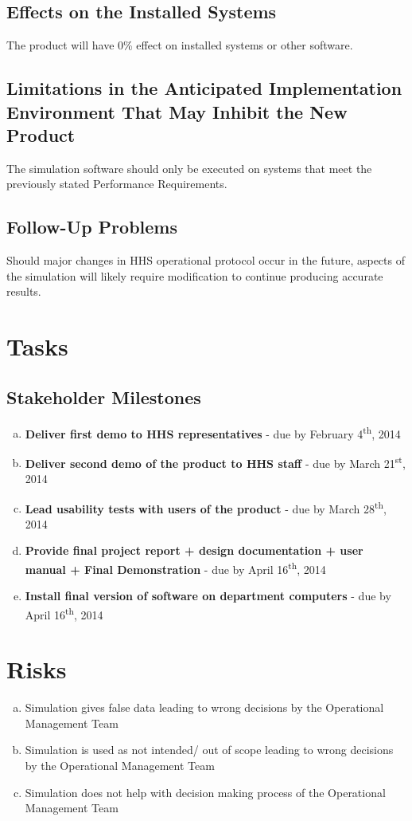 \documentclass[paper=letter, fontsize=10pt]{scrartcl}
\numberwithin{equation}{section}		%
\numberwithin{figure}{section}			%
\numberwithin{table}{section}				%
\newcommand{\ts}{\textsuperscript}
\begin{document}
\subsection{Effects on the Installed Systems}
The product will have 0\% effect on installed systems or other software.
\subsection{Limitations in the Anticipated Implementation Environment That May Inhibit the New Product}
The simulation software should only be executed on systems that meet the previously stated Performance Requirements.
\subsection{Follow-Up Problems}
Should major changes in HHS operational protocol occur in the future, aspects of the simulation will likely require modification to continue producing accurate results.

\section{Tasks}
\subsection{Stakeholder Milestones}
\begin{enumerate}[(a)]	
	\item \textbf{Deliver first demo to HHS representatives} - due by February 4\ts{th}, 2014
	\item \textbf{Deliver second demo of the product to HHS staff} - due by March 21\ts{st}, 2014
	\item \textbf{Lead usability tests with users of the product} - due by March 28\ts{th}, 2014
	\item \textbf{Provide final project report + design documentation + user manual + Final Demonstration} - due by April 16\ts{th}, 2014
	\item \textbf{Install final version of software on department computers} - due by April 16\ts{th}, 2014
\end{enumerate}
\section{Risks}
\begin{enumerate}[(a)]
	\item Simulation gives false data leading to wrong decisions by the Operational Management Team
	\item Simulation is used as not intended/ out of scope leading to wrong decisions by the Operational Management Team
	\item Simulation does not help with decision making process of the Operational Management Team 
\end{enumerate}
\end{document}
